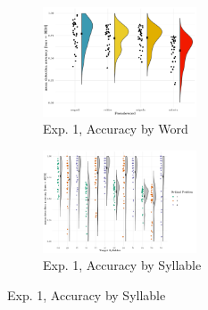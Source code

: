 \documentclass[11pt]{article}
\begin{document}
\begin{figure}
	\begin{subfigure}{\textwidth}
		\includegraphics[width=0.5\textwidth]{exp3fig4bacc.pdf}
		\caption{Exp. 1, Accuracy by Word}
	\end{subfigure} 
	\begin{subfigure}{\textwidth}
		\includegraphics[width=0.5\textwidth]{exp3fig4cacc.pdf}
		\caption{Exp. 1, Accuracy by Syllable}
	\end{subfigure}
	\label{fig:Fig. S3}
\end{figure}



%
%
\printbibliography[heading=bibintoc,title={References}]
\end{document}
